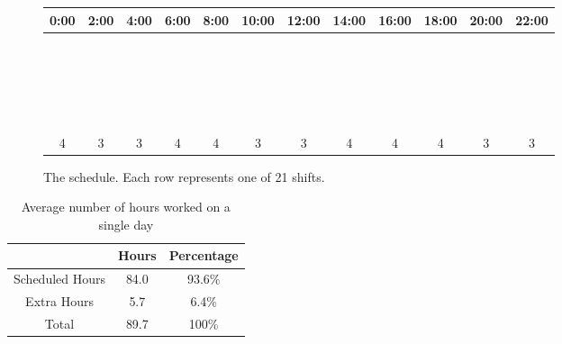 \begin{figure}
	\centering

	\renewcommand{\arraystretch}{0.6} %
	
\begin{tabular}{|c|c|c|c|c|c|c|c|c|c|c|c|}
	\hline
	0:00 & 2:00 & 4:00 & 6:00 & 8:00 & 10:00 & 12:00 & 14:00 & 16:00 & 18:00 & 20:00 & 22:00  \\
	\hline
	\hline
	\cc & \cc & & & & & & & & & & \\ \hline 
	& \cc & \cc & & & & & & & & & \\ \hline
	& \cc & \cc & & & & & & & & & \\ \hline
	& & \cc & \cc & & & & & & & & \\ \hline
	& & & \cc & \cc & & & & & & & \\ \hline
	& & & \cc & \cc & & & & & & & \\ \hline
	& & & \cc & \cc & & & & & & & \\ \hline
	& & & & \cc & \cc & & & & & & \\ \hline
	& & & & & \cc & \cc & & & & & \\ \hline
	& & & & & \cc & \cc & & & & & \\ \hline
	& & & & & & \cc & \cc & & & & \\ \hline
	& & & & & & & \cc & \cc & & & \\ \hline
	& & & & & & & \cc & \cc & & & \\ \hline
	& & & & & & & \cc & \cc & & & \\ \hline
	& & & & & & & & \cc & \cc & & \\ \hline
	& & & & & & & & & \cc & \cc & \\ \hline
	& & & & & & & & & \cc & \cc & \\ \hline
	& & & & & & & & & \cc & \cc & \\ \hline
	\cc & & & & & & & & & & & \cc \\ \hline
	\cc & & & & & & & & & & & \cc \\ \hline
	\cc & & & & & & & & & & & \cc \\ 
	\hline
	\hline
	4 & 3 & 3 & 4 & 4 & 3 & 3 & 4 & 4 & 4 & 3 & 3\\
	\hline
\end{tabular}
\caption{The schedule. Each row represents one of 21 shifts.}
\label{fig:schedule}
\end{figure}

\begin{table}
	\centering
\begin{tabular}{|c|c|c|}
	\hline
	& Hours & Percentage \\ \hline \hline
	Scheduled Hours & 84.0 & 93.6\%\\
	Extra Hours & 5.7 & 6.4\% \\
	\hline
	\hline
	Total & 89.7 & 100\% \\
	\hline
\end{tabular}
\caption{Average number of hours worked on a single day}
\label{tab:hours}
\end{table}

